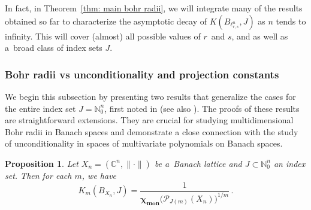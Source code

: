 \documentclass[12pt]{amsart}
\numberwithin{subsection}{section}
\newtheorem{proposition}[theorem]{Proposition}
\theoremstyle{definition}
\theoremstyle{remark}
\newcommand{\NN}{\mathbb N}
\newcommand{\CC}{\mathbb C}
\DeclareMathOperator{\mon}{mon}
\newcommand{\chimon}{\chi_{\mon}}
\newcommand{\Pp}{\mathcal{P}}
\begin{document}
In fact, in Theorem~\ref{thm: main bohr radii}, we will integrate many of the results obtained so far to characterize the asymptotic
decay of $K(B_{\ell_{r,s}^n}, J)$ as $n$ tends to infinity. This will cover (almost) all possible values of $r$~and $s$, and as well
as a~broad class of index sets $J$.




\subsubsection{\bf Bohr radii vs unconditionality and projection constants}

We begin this subsection by presenting two results  that generalize the cases for the entire index set $J = \NN_0^n$,
first noted in \cite{defant2003bohr} (see also \cite[Proposition~19.4 and Lemma 19.5]{defant2019libro}). The proofs
of these results are straightforward extensions. They are crucial for studying multidimensional Bohr radii in Banach
spaces and demonstrate a close connection with the study of unconditionality in spaces of multivariate polynomials
on Banach spaces.

\begin{proposition}\label{prop: Km vs uncond in Pm}
Let ${X_n} = (\CC^n, \| \cdot \|)$ be a~Banach lattice and  $J \subset \NN_0^n$ an index set. Then for each $m$, we have
\[
K_m(B_{X_n},J) = \frac{1}{\boldsymbol{\chimon}\big(\Pp_{J(m)}( X_n)\big)^{1/m}}\,.
\]
\end{proposition}
\end{document}
